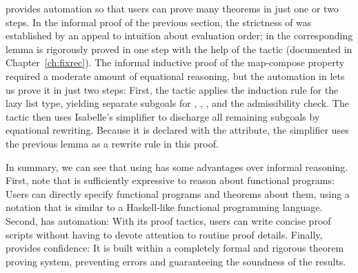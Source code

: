  provides automation so that users can prove many theorems in just one or two steps. In the informal proof of the previous section, the strictness of  was established by an appeal to intuition about evaluation order; in  the corresponding lemma  is rigorously proved in one step with the help of the  tactic (documented in Chapter~\ref{ch:fixrec}). The informal inductive proof of the map-compose property required a moderate amount of equational reasoning, but the automation in  lets us prove it in just two steps: First, the  tactic applies the induction rule for the lazy list type, yielding separate subgoals for , , , and the admissibility check. The  tactic then uses Isabelle's simplifier to discharge all remaining subgoals by equational rewriting. Because it is declared with the \isa{[simp]} attribute, the simplifier uses the previous lemma  as a rewrite rule in this proof.

In summary, we can see that using  has some advantages over informal reasoning. First, note that  is sufficiently expressive to reason about functional programs: Users can directly specify functional programs and theorems about them, using a notation that is similar to a Haskell-like functional programming language. Second,  has automation: With its proof tactics, users can write concise proof scripts without having to devote attention to routine proof details. Finally,  provides confidence: It is built within a completely formal and rigorous theorem proving system, preventing errors and guaranteeing the soundness of the results.



